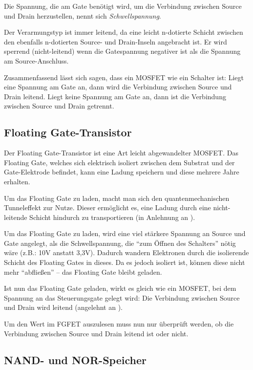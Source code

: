 Die Spannung, die am Gate benötigt wird, um die Verbindung zwischen Source und Drain herzustellen, nennt sich \emph{Schwellspannung}.

Der Verarmungstyp ist immer leitend, da eine leicht n-dotierte Schicht zwischen den ebenfalls n-dotierten Source- und Drain-Inseln angebracht ist. Er wird sperrend (nicht-leitend) wenn die Gatespannung negativer ist als die Spannung am Source-Anschluss.

Zusammenfassend lässt sich sagen, dass ein MOSFET wie ein Schalter ist: Liegt eine Spannung am Gate an, dann wird die Verbindung zwischen Source und Drain leitend. Liegt keine Spannung am Gate an, dann ist die Verbindung zwischen Source und Drain getrennt.

\subsection{Floating Gate-Transistor}

Der Floating Gate-Transistor ist eine Art leicht abgewandelter MOSFET.  Das Floating Gate, welches sich elektrisch isoliert zwischen dem Substrat und der Gate-Elektrode befindet, kann eine Ladung speichern und diese mehrere Jahre erhalten.

Um das Floating Gate zu laden, macht man sich den quantenmechanischen Tunneleffekt zur Nutze. Dieser ermöglicht es, eine Ladung durch eine nicht-leitende Schicht hindurch zu transportieren (in Anlehnung an \parencite{tunneleffektwiki}).

Um das Floating Gate zu laden, wird eine viel stärkere Spannung an Source und Gate angelegt, als die Schwellspannung, die "`zum Öffnen des Schalters"' nötig wäre (z.B.: 10V anstatt 3,3V). Dadurch wandern Elektronen durch die isolierende Schicht des Floating Gates in dieses. Da es jedoch isoliert ist, können diese nicht mehr "`abfließen"' -- das Floating Gate bleibt geladen.

Ist nun das Floating Gate geladen, wirkt es gleich wie ein MOSFET, bei dem Spannung an das Steuerungsgate gelegt wird: Die Verbindung zwischen Source und Drain wird leitend (angelehnt an \parencite{quora}).

Um den Wert im FGFET auszulesen muss nun nur überprüft werden, ob die Verbindung zwischen Source und Drain leitend ist oder nicht.

\subsection{NAND- und NOR-Speicher}



